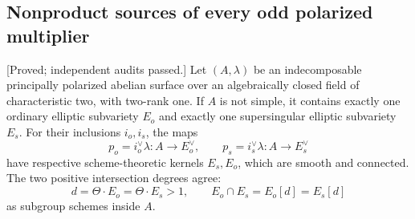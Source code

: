 \subsection{Nonproduct sources of every odd polarized multiplier}
\label{subsec:nonordinary-arbitrary-odd-neighbors-candidate}

\begin{lemma}
\label{lem:nonordinary-mixed-principal-complement-candidate}
\textup{[Proved; independent audits passed.]}
Let $(A,\lambda)$ be an indecomposable principally polarized abelian
surface over an algebraically closed field of characteristic two,
with two-rank one. If $A$ is not simple, it contains exactly one
ordinary elliptic subvariety $E_o$ and exactly one supersingular
elliptic subvariety $E_s$. For their inclusions $i_o,i_s$, the maps
\[
 p_o=i_o^\vee\lambda:A\longrightarrow E_o^\vee,
 \qquad p_s=i_s^\vee\lambda:A\longrightarrow E_s^\vee
\]
have respective scheme-theoretic kernels $E_s,E_o$, which are smooth
and connected. The two positive intersection degrees agree:
\[
 d=\Theta\cdot E_o=\Theta\cdot E_s>1,
 \qquad E_o\cap E_s=E_o[d]=E_s[d]
\]
as subgroup schemes inside $A$.
\end{lemma}


